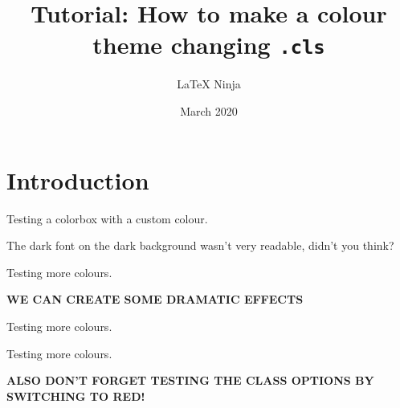 \documentclass[blue]{myColourChangingArticle}
\title{Tutorial: How to make a colour theme changing \texttt{.cls}}
\author{\LaTeX{} Ninja}
\date{March 2020}
\begin{document}
\maketitle
\section{Introduction}

\colorbox{headercolour}{Testing a colorbox with a custom colour.}

\bigskip


\colorbox{headercolour}{
\color{customlight} The dark font on the dark background wasn't very readable, didn't you think? 
}

\begin{center}
    \color{alternativecolour} Testing more colours.
\end{center}


{
\bf\color{customcolour}\MakeUppercase{We can create some dramatic effects}
}
\color{customcolour}{with colours.}


\begin{center}
    \color{myblue} Testing more colours.

    \color{mypurple} Testing more colours.
\end{center}

{
\bf\color{customcolour}\MakeUppercase{Also don't forget testing the class options by switching to red!}
}
\end{document}
